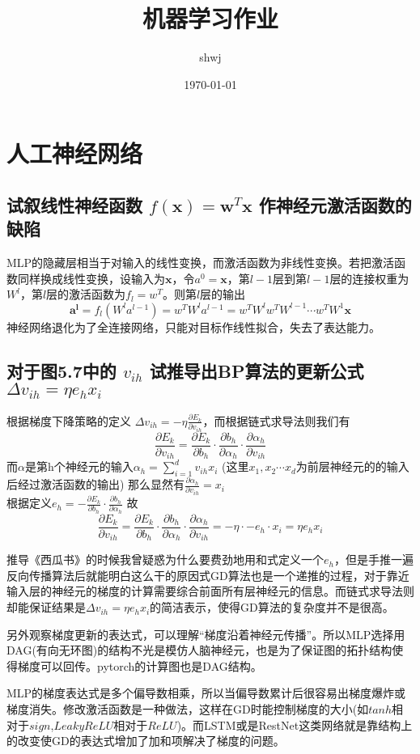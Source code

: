 \documentclass[12pt, a4paper, oneside]{ctexart}
\title{机器学习作业}
\author{shwj}
\date{\today}
\begin{document}
\maketitle

\section{人工神经网络}

\subsection{试叙线性神经函数 \texorpdfstring{$f(\boldsymbol{x} )={\boldsymbol{w}}^T \boldsymbol{x}$ }用作神经元激活函数的缺陷}
\par
MLP的隐藏层相当于对输入的线性变换，而激活函数为非线性变换。若把激活函数同样换成线性变换，设输入为$\boldsymbol{x}$，令$a^{0}=\boldsymbol{x}$，第$l-1$层到第$l-1$层的连接权重为$W^{l}$，第$l$层的激活函数为$f_l=w^{T}$。则第$l$层的输出
$$\boldsymbol{a^l}=f_l(W^{l}a^{l-1})=w^{T}W^{l}a^{l-1}=w^{T}W^{l}w^{T}W^{l-1}\cdots w^{T}W^{1}\boldsymbol{x} $$ 
神经网络退化为了全连接网络，只能对目标作线性拟合，失去了表达能力。


\subsection{对于图5.7中的 \texorpdfstring{$v_{ih}$ },试推导出BP算法的更新公式 \texorpdfstring{$ \Delta v_{ih}=\eta e_h x_i$ }.}
根据梯度下降策略的定义 $ \Delta v_{ih}= -\eta \frac{\partial E_k}{\partial v_{ih}}$，而根据链式求导法则我们有
$$\frac{\partial E_k}{\partial v_{ih}}=\frac{\partial E_k}{\partial b_h} \cdot \frac{\partial b_h}{\partial {\alpha}_h} \cdot \frac{\partial {\alpha}_h}{\partial v_{ih}}$$
而$\alpha$是第h个神经元的输入$\alpha_h=\sum_{i=1}^{d}v_{ih}x_i$ 
(这里$x_1,x_2 \cdots x_d$为前层神经元的的输入后经过激活函数的输出) 那么显然有$\frac{\partial {\alpha}_h}{\partial v_{ih}}=x_i$
\\ %
根据定义$e_h=- \frac{\partial E_k}{\partial b_h} \cdot \frac{\partial b_h}{\partial {\alpha}_h} $
故$$\frac{\partial E_k}{\partial v_{ih}}=\frac{\partial E_k}{\partial b_h} \cdot \frac{\partial b_h}{\partial {\alpha}_h} \cdot \frac{\partial {\alpha}_h}{\partial v_{ih}}=- \eta \cdot -e_h  \cdot x_i=\eta e_h x_i$$
\par 
推导《西瓜书》的时候我曾疑惑为什么要费劲地用和式定义一个$e_h$，但是手推一遍反向传播算法后就能明白这么干的原因式GD算法也是一个递推的过程，对于靠近输入层的神经元的梯度的计算需要综合前面所有层神经元的信息。而链式求导法则却能保证结果是$ \Delta v_{ih}=\eta e_h x_i$的简洁表示，使得GD算法的复杂度并不是很高。
\par
另外观察梯度更新的表达式，可以理解“梯度沿着神经元传播”。所以MLP选择用DAG(有向无环图)的结构不光是模仿人脑神经元，也是为了保证图的拓扑结构使得梯度可以回传。pytorch的计算图也是DAG结构。
\par
MLP的梯度表达式是多个偏导数相乘，所以当偏导数累计后很容易出梯度爆炸或梯度消失。修改激活函数是一种做法，这样在GD时能控制梯度的大小(如$tanh$相对于$sign$,$LeakyReLU$相对于$ReLU$)。而LSTM或是RestNet这类网络就是靠结构上的改变使GD的表达式增加了加和项解决了梯度的问题。
\end{document}
